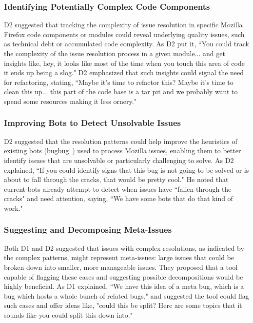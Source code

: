 {	
\subsubsection{\textbf{Identifying Potentially Complex Code Components}} 
D2 suggested that tracking the complexity of issue resolution in specific Mozilla Firefox code components or modules could reveal underlying quality issues, such as technical debt or accumulated code complexity. As D2 put it, ``You could track the complexity of the issue resolution process in a given module... and get insights like, hey, it looks like most of the time when you touch this area of code it ends up being a slog." D2 emphasized that such insights could signal the need for refactoring, stating, ``Maybe it's time to refactor this? Maybe it's time to clean this up... this part of the code base is a tar pit and we probably want to spend some resources making it less ornery." 
	
	
\subsubsection{\textbf{Improving Bots to Detect Unsolvable Issues}} 
D2 suggested that the resolution patterns could help improve the heuristics of existing bots (\eg bugbug~\cite{bugbug}) used to process Mozilla issues, enabling them to better identify issues that are unsolvable or particularly challenging to solve. As D2 explained, ``If you could identify signs that this bug is not going to be solved or is about to fall through the cracks, that would be pretty cool." He noted that current bots already attempt to detect when issues have ``fallen through the cracks" and need attention, saying, ``We have some bots that do that kind of work." 
	
\subsubsection{\textbf{Suggesting and Decomposing Meta-Issues}} 
Both D1 and D2 suggested that issues with complex resolutions, as indicated by the complex patterns, might represent meta-issues: large issues that could be broken down into smaller, more manageable issues. They proposed that a tool capable of flagging these cases and suggesting possible decompositions would be highly beneficial. As D1 explained, ``We have this idea of a meta bug, which is a bug which hosts a whole bunch of related bugs," and suggested the tool could flag such cases and offer ideas like, "could this be split? Here are some topics that it sounds like you could split this down into."
	
}
